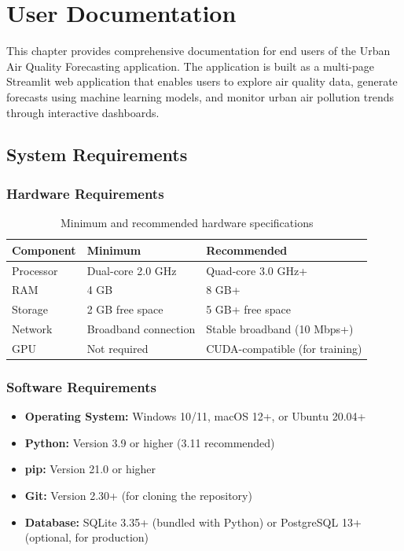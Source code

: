 \chapter{User Documentation}
\label{ch:user}

This chapter provides comprehensive documentation for end users of the Urban Air Quality Forecasting application. The application is built as a multi-page Streamlit web application that enables users to explore air quality data, generate forecasts using machine learning models, and monitor urban air pollution trends through interactive dashboards.

\section{System Requirements}
\label{sec:user-requirements}

\subsection{Hardware Requirements}

\begin{table}[htbp]
\centering
\caption{Minimum and recommended hardware specifications}
\label{tab:hardware-requirements}
\begin{tabular}{|l|l|l|}
\hline
\textbf{Component} & \textbf{Minimum} & \textbf{Recommended} \\
\hline
Processor & Dual-core 2.0 GHz & Quad-core 3.0 GHz+ \\
\hline
RAM & 4 GB & 8 GB+ \\
\hline
Storage & 2 GB free space & 5 GB+ free space \\
\hline
Network & Broadband connection & Stable broadband (10 Mbps+) \\
\hline
GPU & Not required & CUDA-compatible (for training) \\
\hline
\end{tabular}
\end{table}

\subsection{Software Requirements}

\begin{itemize}
    \item \textbf{Operating System:} Windows 10/11, macOS 12+, or Ubuntu 20.04+
    \item \textbf{Python:} Version 3.9 or higher (3.11 recommended)
    \item \textbf{pip:} Version 21.0 or higher
    \item \textbf{Git:} Version 2.30+ (for cloning the repository)
    \item \textbf{Database:} SQLite 3.35+ (bundled with Python) or PostgreSQL 13+ (optional, for production)
\end{itemize}

